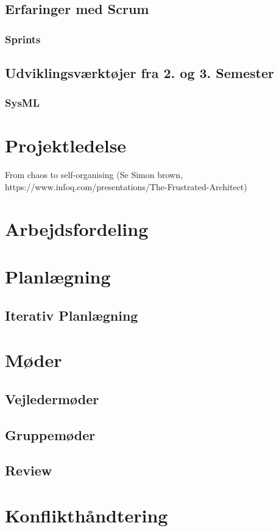\documentclass[a4paper,12pt,fleqn,oneside]{article}
\begin{document}
\subsection{Erfaringer med Scrum}
\subsubsection{Sprints}

\subsection{Udviklingsværktøjer fra 2. og 3. Semester}
\subsubsection{SysML}

\section{Projektledelse}
From chaos to self-organising (Se Simon brown, https://www.infoq.com/presentations/The-Frustrated-Architect) 

\section{Arbejdsfordeling}

\section{Planlægning}
\subsection{Iterativ Planlægning}

\section{Møder}
\subsection{Vejledermøder}
\subsection{Gruppemøder}
\subsection{Review}

\section{Konflikthåndtering}
\end{document}
